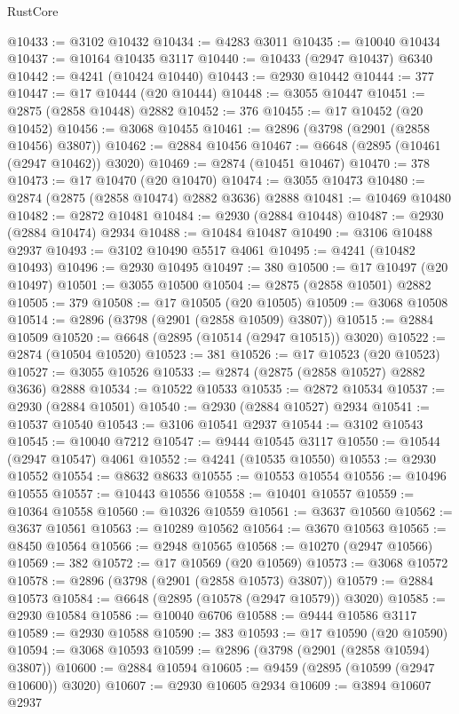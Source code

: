 \begin{lexlean}{RustCore}
\begin{coremodule}
@10433 := @3102 @10432
@10434 := @4283 @3011
@10435 := @10040 @10434
@10437 := @10164 @10435 @3117
@10440 := @10433 (@2947 @10437) @6340
@10442 := @4241 (@10424 @10440)
@10443 := @2930 @10442
@10444 := 377
@10447 := @17 @10444 (@20 @10444)
@10448 := @3055 @10447
@10451 := @2875 (@2858 @10448) @2882
@10452 := 376
@10455 := @17 @10452 (@20 @10452)
@10456 := @3068 @10455
@10461 := @2896 (@3798 (@2901 (@2858 @10456) @3807))
@10462 := @2884 @10456
@10467 := @6648 (@2895 (@10461 (@2947 @10462)) @3020)
@10469 := @2874 (@10451 @10467)
@10470 := 378
@10473 := @17 @10470 (@20 @10470)
@10474 := @3055 @10473
@10480 := @2874 (@2875 (@2858 @10474) @2882 @3636) @2888
@10481 := @10469 @10480
@10482 := @2872 @10481
@10484 := @2930 (@2884 @10448)
@10487 := @2930 (@2884 @10474) @2934
@10488 := @10484 @10487
@10490 := @3106 @10488 @2937
@10493 := @3102 @10490 @5517 @4061
@10495 := @4241 (@10482 @10493)
@10496 := @2930 @10495
@10497 := 380
@10500 := @17 @10497 (@20 @10497)
@10501 := @3055 @10500
@10504 := @2875 (@2858 @10501) @2882
@10505 := 379
@10508 := @17 @10505 (@20 @10505)
@10509 := @3068 @10508
@10514 := @2896 (@3798 (@2901 (@2858 @10509) @3807))
@10515 := @2884 @10509
@10520 := @6648 (@2895 (@10514 (@2947 @10515)) @3020)
@10522 := @2874 (@10504 @10520)
@10523 := 381
@10526 := @17 @10523 (@20 @10523)
@10527 := @3055 @10526
@10533 := @2874 (@2875 (@2858 @10527) @2882 @3636) @2888
@10534 := @10522 @10533
@10535 := @2872 @10534
@10537 := @2930 (@2884 @10501)
@10540 := @2930 (@2884 @10527) @2934
@10541 := @10537 @10540
@10543 := @3106 @10541 @2937
@10544 := @3102 @10543
@10545 := @10040 @7212
@10547 := @9444 @10545 @3117
@10550 := @10544 (@2947 @10547) @4061
@10552 := @4241 (@10535 @10550)
@10553 := @2930 @10552
@10554 := @8632 @8633
@10555 := @10553 @10554
@10556 := @10496 @10555
@10557 := @10443 @10556
@10558 := @10401 @10557
@10559 := @10364 @10558
@10560 := @10326 @10559
@10561 := @3637 @10560
@10562 := @3637 @10561
@10563 := @10289 @10562
@10564 := @3670 @10563
@10565 := @8450 @10564
@10566 := @2948 @10565
@10568 := @10270 (@2947 @10566)
@10569 := 382
@10572 := @17 @10569 (@20 @10569)
@10573 := @3068 @10572
@10578 := @2896 (@3798 (@2901 (@2858 @10573) @3807))
@10579 := @2884 @10573
@10584 := @6648 (@2895 (@10578 (@2947 @10579)) @3020)
@10585 := @2930 @10584
@10586 := @10040 @6706
@10588 := @9444 @10586 @3117
@10589 := @2930 @10588
@10590 := 383
@10593 := @17 @10590 (@20 @10590)
@10594 := @3068 @10593
@10599 := @2896 (@3798 (@2901 (@2858 @10594) @3807))
@10600 := @2884 @10594
@10605 := @9459 (@2895 (@10599 (@2947 @10600)) @3020)
@10607 := @2930 @10605 @2934
@10609 := @3894 @10607 @2937

\end{coremodule}
\end{lexlean}
